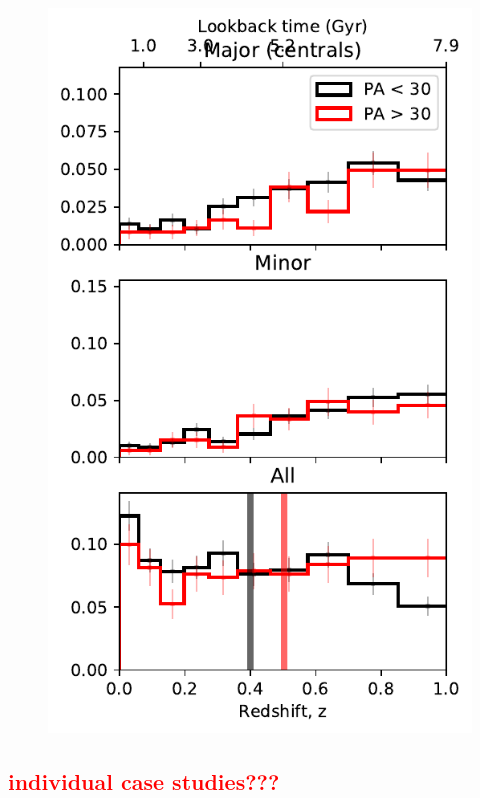\documentclass[fleqn,usenatbib]{mnras}
\newcommand{\red}[1]{{\textcolor{red}{#1}}}
\begin{document}
\begin{figure}
	\includegraphics[width=\linewidth]{tng_results/time_since_last_merger_satellites_PA_split.pdf}
    \caption{}
    \label{fig:last_merger_sat}
\end{figure}

\subsection{\red{individual case studies???}}



\end{document}
